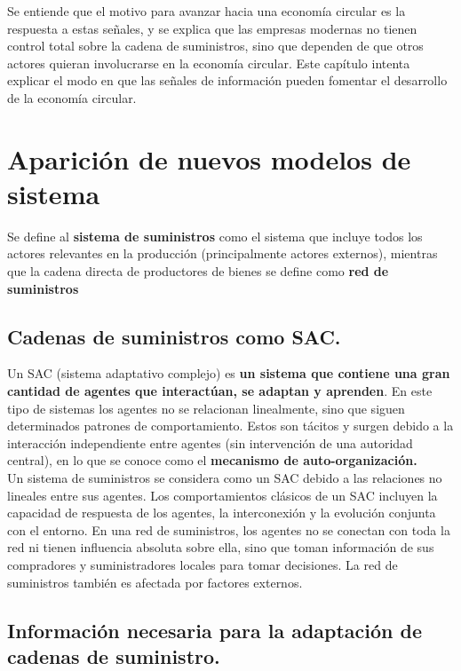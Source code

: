 \documentclass[runningheads]{llncs}
\begin{document}
Se entiende que el motivo para avanzar hacia una economía circular es la
respuesta a estas señales, y se explica que las empresas modernas no
tienen control total sobre la cadena de suministros, sino que dependen
de que otros actores quieran involucrarse en la economía circular. Este
capítulo intenta explicar el modo en que las señales de información
pueden fomentar el desarrollo de la economía circular.

\hypertarget{apariciuxf3n-de-nuevos-modelos-de-sistema}{%
\section{Aparición de nuevos modelos de
sistema}\label{apariciuxf3n-de-nuevos-modelos-de-sistema}}

Se define al \textbf{sistema de suministros} como el sistema que incluye
todos los actores relevantes en la producción (principalmente actores
externos), mientras que la cadena directa de productores de bienes se
define como \textbf{red de suministros}

\hypertarget{cadenas-de-suministros-como-sac.}{%
\subsection{Cadenas de suministros como
SAC.}\label{cadenas-de-suministros-como-sac.}}

Un SAC (sistema adaptativo complejo) es
\textbf{un sistema que contiene una gran cantidad de agentes que interactúan, se adaptan y aprenden}.
En este tipo de sistemas los agentes no se relacionan linealmente, sino
que siguen determinados patrones de comportamiento. Estos son tácitos y
surgen debido a la interacción independiente entre agentes (sin
intervención de una autoridad central), en lo que se conoce como el
\textbf{mecanismo de auto-organización.}\\

Un sistema de suministros se considera como un SAC debido a las
relaciones no lineales entre sus agentes. Los comportamientos clásicos
de un SAC incluyen la capacidad de respuesta de los agentes, la
interconexión y la evolución conjunta con el entorno. En una red de
suministros, los agentes no se conectan con toda la red ni tienen
influencia absoluta sobre ella, sino que toman información de sus
compradores y suministradores locales para tomar decisiones. La red de
suministros también es afectada por factores externos.

\hypertarget{informaciuxf3n-necesaria-para-la-adaptaciuxf3n-de-cadenas-de-suministro.}{%
\subsection{Información necesaria para la adaptación de cadenas de
suministro.}\label{informaciuxf3n-necesaria-para-la-adaptaciuxf3n-de-cadenas-de-suministro.}}
\end{document}
